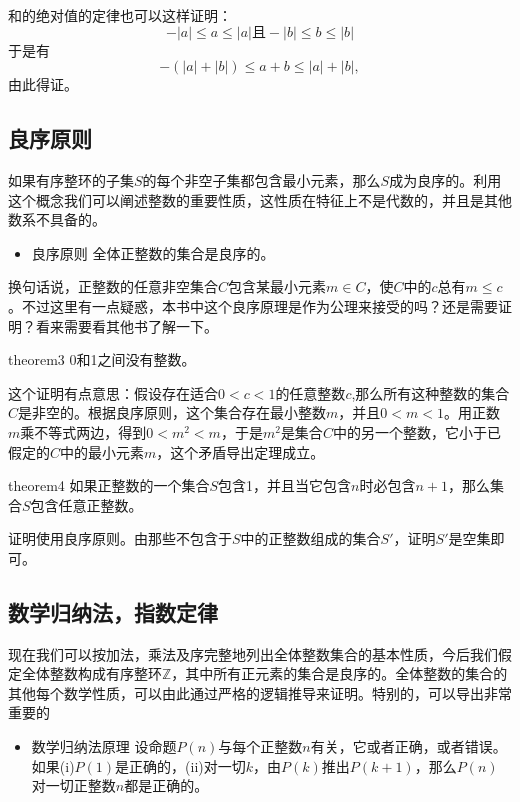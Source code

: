 和的绝对值的定律也可以这样证明：
\[
-|a| \le a \le |a| \text{且} -|b| \le b \le |b|
\]
于是有
\[
-(|a|+|b|) \le  a + b \le |a|+|b|,
\]
由此得证。


\subsection{良序原则}
如果有序整环的子集$S$的每个非空子集都包含最小元素，那么$S$成为良序的。利用这个概念我们可以阐述整数的重要性质，这性质在特征上不是代数的，并且是其他数系不具备的。
\begin{itemize}
\item 良序原则 全体正整数的集合是良序的。
\end{itemize}

换句话说，正整数的任意非空集合$C$包含某最小元素$m \in C$，使$C$中的$c$总有$m \le c$。不过这里有一点疑惑，本书中这个良序原理是作为公理来接受的吗？还是需要证明？看来需要看其他书了解一下。

\begin{theorem}{}{theorem3}
0和1之间没有整数。
\end{theorem}

这个证明有点意思：假设存在适合$0<c<1$的任意整数$c$,那么所有这种整数的集合$C$是非空的。根据良序原则，这个集合存在最小整数$m$，并且$0 < m < 1$。用正数$m$乘不等式两边，得到$0 < m^2 < m$，于是$m^2$是集合$C$中的另一个整数，它小于已假定的$C$中的最小元素$m$，这个矛盾导出定理成立。

\begin{theorem}{}{theorem4}
如果正整数的一个集合$S$包含1，并且当它包含$n$时必包含$n+1$，那么集合$S$包含任意正整数。
\end{theorem}

证明使用良序原则。由那些不包含于$S$中的正整数组成的集合$S'$，证明$S'$是空集即可。

\subsection{数学归纳法，指数定律}
现在我们可以按加法，乘法及序完整地列出全体整数集合的基本性质，今后我们假定全体整数构成有序整环$\mathbb{Z}$，其中所有正元素的集合是良序的。全体整数的集合的其他每个数学性质，可以由此通过严格的逻辑推导来证明。特别的，可以导出非常重要的
\begin{itemize}
\item \textcolor{main}{数学归纳法原理} 设命题$P(n)$与每个正整数$n$有关，它或者正确，或者错误。如果(i)$P(1)$是正确的，(ii)对一切$k$，由$P(k)$推出$P(k+1)$，那么$P(n)$对一切正整数$n$都是正确的。
\end{itemize}

